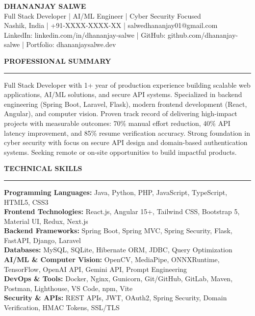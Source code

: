 \documentclass[10pt,letterpaper]{article}
\newcommand{\resheading}[1]{
    {\large \textbf{#1}}
    \vspace{0.3em}
    \hrule
    \vspace{0.1em}
}
\begin{document}
{\centering
\textbf{\Large DHANANJAY SALWE} \\
\vspace{0.2em}
Full Stack Developer | AI/ML Engineer | Cyber Security Focused \\
\vspace{0.3em}
\small
Nashik, India | +91-XXXX-XXXX-XX | salwedhananjay01@gmail.com \\
LinkedIn: linkedin.com/in/dhananjay-salwe | GitHub: github.com/dhananjay-salwe | Portfolio: dhananjaysalwe.dev \\
\vspace{0.3em}
}

\resheading{PROFESSIONAL SUMMARY}
\small
Full Stack Developer with 1+ year of production experience building scalable web applications, AI/ML solutions, and secure API systems. Specialized in backend engineering (Spring Boot, Laravel, Flask), modern frontend development (React, Angular), and computer vision. Proven track record of delivering high-impact projects with measurable outcomes: 70\% manual effort reduction, 40\% API latency improvement, and 85\% resume verification accuracy. Strong foundation in cyber security with focus on secure API design and domain-based authentication systems. Seeking remote or on-site opportunities to build impactful products.

\vspace{0.4em}

\resheading{TECHNICAL SKILLS}

\small
\textbf{Programming Languages:} Java, Python, PHP, JavaScript, TypeScript, HTML5, CSS3 \\
\textbf{Frontend Technologies:} React.js, Angular 15+, Tailwind CSS, Bootstrap 5, Material UI, Redux, Next.js \\
\textbf{Backend Frameworks:} Spring Boot, Spring MVC, Spring Security, Flask, FastAPI, Django, Laravel \\
\textbf{Databases:} MySQL, SQLite, Hibernate ORM, JDBC, Query Optimization \\
\textbf{AI/ML \& Computer Vision:} OpenCV, MediaPipe, ONNXRuntime, TensorFlow, OpenAI API, Gemini API, Prompt Engineering \\
\textbf{DevOps \& Tools:} Docker, Nginx, Gunicorn, Git/GitHub, GitLab, Maven, Postman, Lighthouse, VS Code, npm, Vite \\
\textbf{Security \& APIs:} REST APIs, JWT, OAuth2, Spring Security, Domain Verification, HMAC Tokens, SSL/TLS \\
\end{document}
